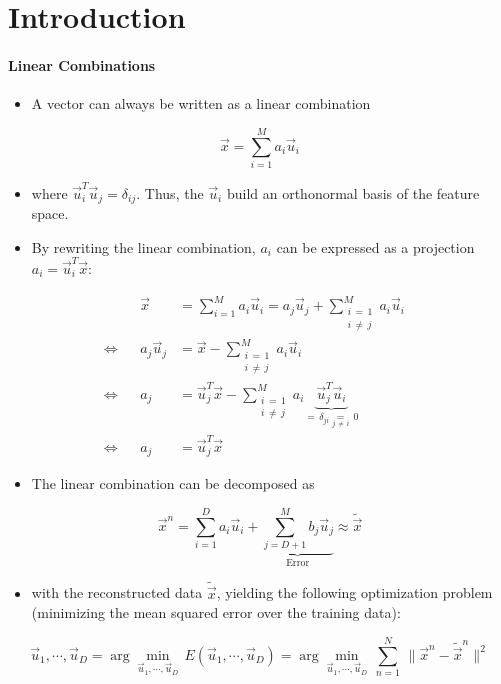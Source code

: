 	\section{Introduction}
		\paragraph{Linear Combinations}
			\begin{itemize}
				\item A vector can always be written as a linear combination
			\end{itemize}
			\begin{equation}
				\vec{x} = \sum_{i = 1}^{M} a_i \vec{u}_i
			\end{equation}
			\begin{itemize}
				\item[] where \( \vec{u}_i^T \vec{u}_j = \delta_{ij} \). Thus, the \( \vec{u}_i \) build an orthonormal basis of the feature space.
				\item By rewriting the linear combination, \( a_i \) can be expressed as a projection \( a_i = \vec{u}_i^T \vec{x} \):
			\end{itemize}
			\begin{align}
				&& \vec{x} &= \sum_{i = 1}^{M} a_i \vec{u}_i = a_j \vec{u}_j + \sum_{\substack{i \,=\,  1 \\ i \,\neq\, j}}^{M} a_i \vec{u}_i & \\
				\iff && a_j \vec{u}_j &= \vec{x} - \sum_{\substack{i \,=\, 1 \\ i \,\neq\, j}}^{M} a_i \vec{u}_i & \\
				\iff && a_j &= \vec{u}_j^T \vec{x} - \sum_{\substack{i \,=\, 1 \\ i \,\neq\, j}}^{M} a_i \underbrace{\vec{u}_j^T \vec{u}_i}_{ =\, \delta_{ji} \underset{j \,\neq\, i}{=}\, 0 } & \\
				\iff && a_j &= \vec{u}_j^T \vec{x} &
			\end{align}
			\begin{itemize}
				\item The linear combination can be decomposed as
			\end{itemize}
			\begin{equation}
				\vec{x}^n = \sum_{i = 1}^{D} a_i \vec{u}_i + \underbrace{\sum_{j = D + 1}^{M} b_j \vec{u}_j}_\textrm{Error} \approx \tilde{\vec{x}}
			\end{equation}
			\begin{itemize}
				\item[] with the reconstructed data \(\tilde{\vec{x}}\), yielding the following optimization problem (minimizing the mean squared error over the training data):
			\end{itemize}
			\begin{equation}
				\vec{u}_1, \cdots, \vec{u}_D = \arg\min\limits_{\vec{u}_1, \cdots, \vec{u}_D} \, E(\vec{u}_1, \cdots, \vec{u}_D) = \arg\min\limits_{\vec{u}_1, \cdots, \vec{u}_D} \, \sum_{n = 1}^{N} \, \lVert \vec{x}^n - \tilde{\vec{x}}^n \rVert^2
			\end{equation}

